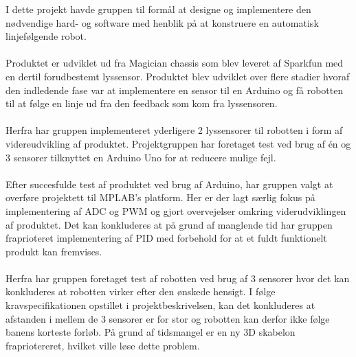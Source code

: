 I dette projekt havde gruppen til formål at designe og implementere den nødvendige hard- og software med henblik på at konstruere en automatisk linjefølgende robot.
\\
\\
Produktet er udviklet ud fra Magician chassis som blev leveret af Sparkfun med en dertil forudbestemt lyssensor. Produktet blev udviklet over flere stadier hvoraf den indledende fase var at implementere en sensor til en Arduino og få robotten til at følge en linje ud fra den feedback som kom fra lyssensoren. 
\\
\\
Herfra har gruppen implementeret yderligere 2 lyssensorer til robotten i form af videreudvikling af produktet. Projektgruppen har foretaget test ved brug af én og 3 sensorer tilknyttet en Arduino Uno for at reducere mulige fejl. 
\\
\\
Efter succesfulde test af produktet ved brug af Arduino, har gruppen valgt at overføre projektett til MPLAB's platform. Her er der lagt særlig fokus på implementering af ADC og PWM og gjort overvejelser omkring viderudviklingen af produktet. Det kan konkluderes at på grund af manglende tid har gruppen fraprioteret implementering af PID med forbehold for at et fuldt funktionelt produkt kan fremvises. 
\\
\\
Herfra har gruppen foretaget test af robotten ved brug af 3 sensorer hvor det kan konkluderes at robotten virker efter den ønskede hensigt. I følge kravspecifikationen opstillet i projektbeskrivelsen, kan det konkluderes at afstanden i mellem de 3 sensorer er for stor og robotten kan derfor ikke følge banens korteste forløb. På grund af tidsmangel er en ny 3D skabelon frapriotereret, hvilket ville løse dette problem.    

